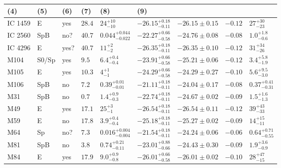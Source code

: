 \begin{table*}
\begin{center}
\begin{tabular}{lllllllll}
\multicolumn{1}{l}{(4)} &                             
\multicolumn{1}{l}{(5)} &                             
\multicolumn{1}{l}{(6)} &                             
\multicolumn{1}{l}{(7)} &                             
\multicolumn{1}{l}{(8)} &                             
\multicolumn{1}{l}{(9)} \\                         
\hline                                                
IC 1459  &  E  &  yes   &  $28.4$  &  $24_{-10}^{+10}$   &  $-26.15_{-0.11}^{+0.18}$   &  $-26.15 \pm 0.15$   &  $-0.12$  &  $27_{-23}^{+30}$   \\ 
IC 2560  &  SpB  &  no?  &  $40.7$  &  $0.044_{-0.022}^{+0.044}$   &  $-22.27_{-0.58}^{+0.66}$   &  $-24.76 \pm 0.08$   &  $-0.08$  &  $1.0_{-0.6}^{+1.8}$   \\ 
IC 4296  &  E  &  yes?  &  $40.7$  &  $11_{-2}^{+2}$   &  $-26.35_{-0.11}^{+0.18}$   &  $-26.35 \pm 0.10$   &  $-0.12$  &  $31_{-26}^{+34}$   \\ 
M104  &  S0/Sp  &  yes   &  $9.5$  &  $6.4_{-0.4}^{+0.4}$   &  $-23.91_{-0.58}^{+0.66}$   &  $-25.21 \pm 0.06$   &  $-0.12$  &  $3.4_{-1.9}^{+5.8}$   \\ 
M105  &  E  &  yes   &  $10.3$  &  $4_{-1}^{+1}$   &  $-24.29_{-0.58}^{+0.66}$   &  $-24.29 \pm 0.27$   &  $-0.10$  &  $5.6_{-3.0}^{+9.5}$   \\ 
M106  &  SpB  &  no   &  $7.2$  &  $0.39_{-0.01}^{+0.01}$   &  $-21.11_{-0.11}^{+0.18}$   &  $-24.04 \pm 0.17$   &  $-0.08$  &  $0.37_{-0.31}^{+0.41}$   \\ 
M31  &  SpB  &  no   &  $0.7$  &  $1.4_{-0.3}^{+0.9}$   &  $-22.74_{-0.11}^{+0.18}$   &  $-24.67 \pm 0.02$   &  $-0.09$  &  $1.5_{-1.3}^{+1.6}$   \\ 
M49  &  E  &  yes   &  $17.1$  &  $25_{-1}^{+3}$   &  $-26.54_{-0.11}^{+0.18}$   &  $-26.54 \pm 0.11$   &  $-0.12$  &  $39_{-33}^{+43}$   \\ 
M59  &  E  &  no   &  $17.8$  &  $3.9_{-0.4}^{+0.4}$   &  $-25.18_{-0.11}^{+0.18}$   &  $-25.27 \pm 0.02$   &  $-0.09$  &  $14_{-11}^{+15}$   \\ 
M64  &  Sp  &  no?  &  $7.3$  &  $0.016_{-0.004}^{+0.004}$   &  $-21.54_{-0.11}^{+0.18}$   &  $-24.24 \pm 0.06$   &  $-0.06$  &  $0.64_{-0.55}^{+0.71}$   \\ 
M81  &  SpB  &  no   &  $3.8$  &  $0.74_{-0.11}^{+0.21}$   &  $-23.01_{-0.66}^{+0.88}$   &  $-24.43 \pm 0.30$   &  $-0.09$  &  $1.9_{-0.9}^{+3.6}$   \\ 
M84  &  E  &  yes   &  $17.9$  &  $9.0_{-0.8}^{+0.9}$   &  $-26.01_{-0.58}^{+0.66}$   &  $-26.01 \pm 0.02$   &  $-0.10$  &  $28_{-15}^{+47}$   \\ 

\end{tabular}
\end{center}
\end{table*}
